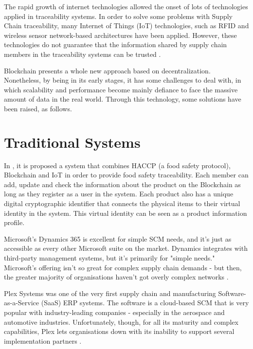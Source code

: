 \label{chap:RelatedWork}

\acresetall 

The rapid growth of internet technologies allowed the onset of lots of technologies applied in traceability systems. In order to solve some problems with Supply Chain traceability, many Internet of Things (IoT) technologies, such as RFID and wireless sensor network-based architectures have been applied. However, these technologies do not guarantee that the information shared by supply chain members in the traceability systems can be trusted \cite{tian2017supply}.

Blockchain presents a whole new approach based on decentralization. Nonetheless, by being in its early stages, it has some challenges to deal with, in which scalability and performance become mainly defiance to face the massive amount of data in the real world. Through this technology, some solutions have been raised, as follows.

\section{Traditional Systems} \label{sec:TraditionalSystems}

In \cite{tian2017supply}, it is proposed a system that combines HACCP (a food safety protocol), Blockchain and IoT in order to provide food safety traceability. Each member can add, update and check the information about the product on the Blockchain as long as they register as a user in the system. Each product also has a unique digital cryptographic identifier that connects the physical items to their virtual identity in the system. This virtual identity can be seen as a product information profile.

Microsoft's Dynamics 365 is excellent for simple SCM needs, and it's just as accessible as every other Microsoft suite on the market. Dynamics integrates with third-party management systems, but it's primarily for "simple needs." Microsoft's offering isn't so great for complex supply chain demands - but then, the greater majority of organisations haven't got overly complex networks \cite{bellu2018microsoft}.

Plex Systems was one of the very first supply chain and manufacturing Software-as-a-Service (SaaS) ERP systems. The software is a cloud-based SCM that is very popular with industry-leading companies - especially in the aerospace and automotive industries. Unfortunately, though, for all its maturity and complex capabilities, Plex lets organisations down with its inability to support several implementation partners \cite{plex}.

